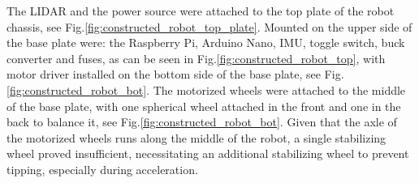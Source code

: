 The LIDAR and the power source were attached to the top plate of the robot chassis, see Fig.\:\ref{fig:constructed_robot_top_plate}. Mounted on the upper side of the base plate were: the Raspberry Pi, Arduino Nano, IMU, toggle switch, buck converter and fuses, as can be seen in Fig.\:\ref{fig:constructed_robot_top}, with motor driver installed on the bottom side of the base plate, see Fig.\:\ref{fig:constructed_robot_bot}. The motorized wheels were attached to the middle of the base plate, with one spherical wheel attached in the front and one in the back to balance it, see Fig.\:\ref{fig:constructed_robot_bot}. 
Given that the axle of the motorized wheels runs along the middle of the robot, a single stabilizing wheel proved insufficient, necessitating an additional stabilizing wheel to prevent tipping, especially during acceleration.

